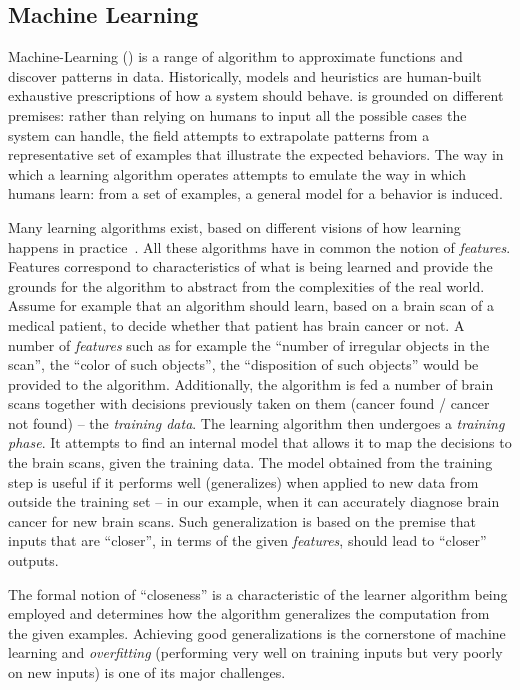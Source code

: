 \subsection{Machine Learning}

Machine-Learning (\ML) \cite{mitchell:1997} is a range of algorithm to
approximate functions and discover patterns in data.
Historically, models and heuristics are human-built exhaustive prescriptions of
how a system should behave. \ML is grounded on different premises:
rather than relying on humans to input all the possible cases the system can
handle, the field attempts to extrapolate patterns from a representative
set of examples that illustrate the expected behaviors. The way in which a
learning algorithm operates attempts to emulate the way in which humans learn:
from a set of examples, a general model for a behavior is induced.

Many learning algorithms exist, based on different visions of how learning
happens in practice~\cite{Domingos:2015}. All these algorithms have in common
the notion of \emph{features}. Features correspond to characteristics of what is
being learned and provide the grounds for the algorithm to abstract from the
complexities of the real world. Assume for example that an algorithm should
learn, based on a brain scan of a medical patient, to decide whether that
patient has brain cancer or not. A number of \emph{features} such as for example
the ``number of irregular objects in the scan'', the ``color of such objects'',
the ``disposition of such objects'' would be provided to the algorithm.
Additionally, the algorithm is fed a number of brain scans together with
decisions previously taken on them (cancer found / cancer not found) -- the
\emph{training data}.
The learning algorithm then undergoes a \emph{training phase}. It attempts to
find an internal model that allows it to map the decisions to the brain scans,
given the training data. The model obtained from the training step is useful if
it performs well (generalizes) when applied to new data from outside the training
set -- in our example, when it can accurately diagnose brain cancer for new
brain scans. Such generalization is based on the premise that inputs that are
``closer'', in terms of the given \emph{features}, should lead to ``closer''
outputs.

The formal notion of ``closeness'' is a characteristic of the learner
algorithm being employed and determines how the algorithm generalizes the computation from
the given examples. Achieving good generalizations is the cornerstone of
machine learning and \emph{overfitting} (performing very well on training
inputs but very poorly on new inputs) is one of its major challenges.

